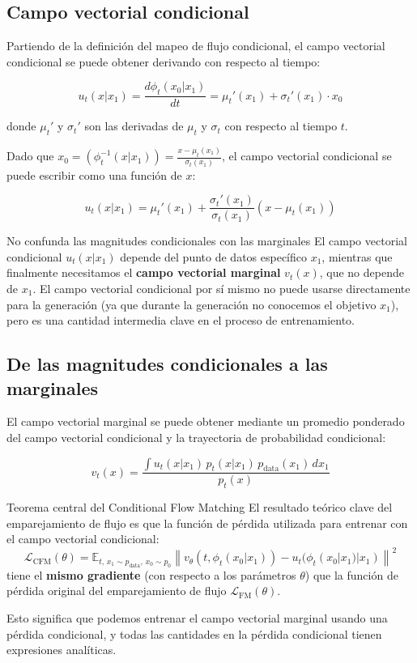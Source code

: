 \documentclass[a4paper]{article}
\begin{document}
\subsection{Campo vectorial condicional}

Partiendo de la definición del mapeo de flujo condicional, el campo vectorial condicional se puede obtener derivando con respecto al tiempo:

$$u_t(x | x_1) = \frac{d\phi_t(x_0 | x_1)}{dt} = \mu_t'(x_1) + \sigma_t'(x_1) \cdot x_0$$

donde $\mu_t'$ y $\sigma_t'$ son las derivadas de $\mu_t$ y $\sigma_t$ con respecto al tiempo $t$.

Dado que $x_0 = (\phi_t^{-1}(x | x_1)) = \frac{x - \mu_t(x_1)}{\sigma_t(x_1)}$, el campo vectorial condicional se puede escribir como una función de $x$:

$$u_t(x | x_1) = \mu_t'(x_1) + \frac{\sigma_t'(x_1)}{\sigma_t(x_1)} \left( x - \mu_t(x_1) \right)$$

\begin{warningbox}{No confunda las magnitudes condicionales con las marginales}
El campo vectorial condicional $u_t(x | x_1)$ depende del punto de datos específico $x_1$, mientras que finalmente necesitamos el \textbf{campo vectorial marginal} $v_t(x)$, que no depende de $x_1$. El campo vectorial condicional por sí mismo no puede usarse directamente para la generación (ya que durante la generación no conocemos el objetivo $x_1$), pero es una cantidad intermedia clave en el proceso de entrenamiento.
\end{warningbox}

\subsection{De las magnitudes condicionales a las marginales}

El campo vectorial marginal se puede obtener mediante un promedio ponderado del campo vectorial condicional y la trayectoria de probabilidad condicional:

$$v_t(x) = \frac{\int u_t(x | x_1) \, p_t(x | x_1) \, p_{\text{data}}(x_1) \, dx_1}{p_t(x)}$$

\begin{importantbox}{Teorema central del Conditional Flow Matching}
El resultado teórico clave del emparejamiento de flujo es que la función de pérdida utilizada para entrenar con el campo vectorial condicional:
$$\mathcal{L}_{\text{CFM}}(\theta) = \mathbb{E}_{t, \, x_1 \sim p_{\text{data}}, \, x_0 \sim p_0} \left\| v_\theta(t, \phi_t(x_0 | x_1)) - u_t(\phi_t(x_0 | x_1) | x_1) \right\|^2$$
tiene el \textbf{mismo gradiente} (con respecto a los parámetros $\theta$) que la función de pérdida original del emparejamiento de flujo $\mathcal{L}_{\text{FM}}(\theta)$.

Esto significa que podemos entrenar el campo vectorial marginal usando una pérdida condicional, y todas las cantidades en la pérdida condicional tienen expresiones analíticas.
\end{importantbox}
\end{document}
